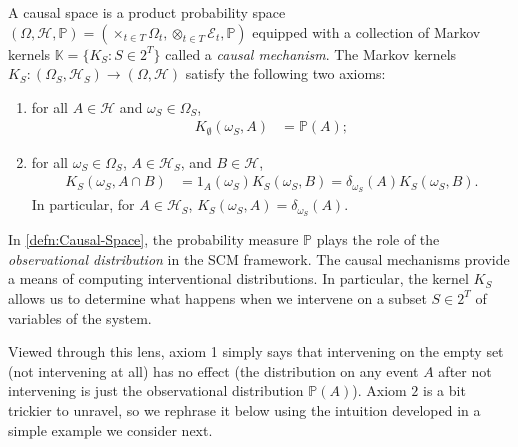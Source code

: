 \documentclass[../main.tex]{subfiles}
\begin{document}
    \begin{defn}
    \label{defn:Causal-Space}
        A causal space is a product probability space ${(\Omega, \mathcal{H}, \mathbb{P}) = (\times_{t\in T}\Omega_t, \otimes_{t\in T}\mathcal{E}_t, \mathbb{P})}$ equipped with a collection of Markov kernels ${\mathbb{K} = \{K_S: S\in 2^T\}}$ called a \emph{causal mechanism}. The Markov kernels $K_S: (\Omega_S, \mathcal{H}_S)\to (\Omega, \mathcal{H})$ satisfy the following two axioms:
        \begin{enumerate}
            \item for all ${A\in \mathcal{H}}$ and ${\omega_S\in \Omega_S}$,\begin{align*}
                K_{\emptyset}(\omega_S, A) &= \mathbb{P}(A);
            \end{align*}
            \item for all ${\omega_S\in \Omega_S}$, ${A\in \mathcal{H}_S}$, and ${B\in \mathcal{H}}$, 
            \begin{align*}
                K_S(\omega_S, A\cap B) &= 1_A(\omega_S)K_S(\omega_S, B) = \delta_{\omega_S}(A)K_S(\omega_S, B).
            \end{align*}
            In particular, for ${A\in \mathcal{H}_S}$, ${K_S(\omega_S,A) = \delta_{\omega_S}(A)}$.
        \end{enumerate}
    \end{defn}
    \begin{rem}
    \label{rem:Observational and interventional distribution}
        In \autoref{defn:Causal-Space}, the probability measure $\mathbb{P}$ plays the role of the \emph{observational distribution} in the SCM framework. The causal mechanisms provide a means of computing interventional distributions. In particular, the kernel $K_S$ allows us to determine what happens when we intervene on a subset $S\in 2^T$ of variables of the system. 
        
        Viewed through this lens, axiom 1 simply says that intervening on the empty set (not intervening at all) has no effect (the distribution on any event $A$ after not intervening is just the observational distribution $\mathbb{P}(A)$). Axiom $2$ is a bit trickier to unravel, so we rephrase it below using the intuition developed in a simple example we consider next.
    \end{rem}
\end{document}

